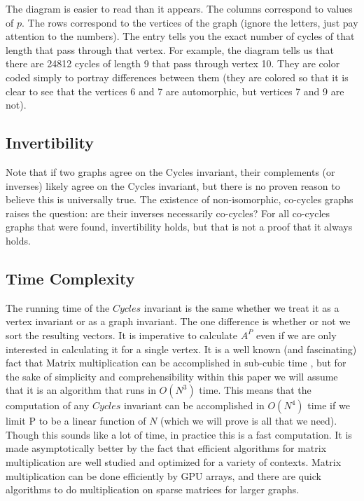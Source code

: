 The diagram is easier to read than it appears.
The columns correspond to values of $p$.
The rows correspond to the vertices of the graph (ignore the letters, just pay attention to the numbers). 
The entry tells you the exact number of cycles of that length that pass through that vertex.
For example, the diagram tells us that there are 24812 cycles of length 9 that pass through vertex 10.
They are color coded simply to portray differences between them (they are colored so that it is clear to see that the vertices 6 and 7 are automorphic, but vertices 7 and 9 are not).

\subsection{Invertibility}
Note that if two graphs agree on the Cycles invariant, their complements (or inverses) likely agree on the Cycles invariant, but there is no proven reason to believe this is universally true.
The existence of non-isomorphic, co-cycles graphs raises the question: are their inverses necessarily co-cycles?
For all co-cycles graphs that were found, invertibility holds, but that is not a proof that it always holds.


\subsection{Time Complexity}
The running time of the $Cycles$ invariant is the same whether we treat it as a vertex invariant or as a graph invariant.
The one difference is whether or not we sort the resulting vectors.
It is imperative to calculate $A^P$ even if we are only interested in calculating it for a single vertex.
It is a well known (and fascinating) fact that Matrix multiplication can be accomplished in sub-cubic time \cite{subcubicrunningmatrixmult}, but for the sake of simplicity and comprehensibility within this paper we will assume that it is an algorithm that runs in $O(N^3)$  time.
This means that the computation of any $Cycles$ invariant can be accomplished in $O(N^4)$ time if we limit P to be a linear function of $N$ (which we will prove is all that we need).
Though this sounds like a lot of time, in practice this is a fast computation.
It is made asymptotically better by the fact that efficient algorithms for matrix multiplication are well studied and optimized for a variety of contexts.
Matrix multiplication can be done efficiently by GPU arrays, and there are quick algorithms to do multiplication on sparse matrices for larger graphs.


